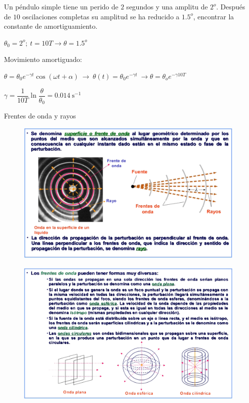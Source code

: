 \begin{prob}
Un péndulo	simple tiene un perido de $2$ segundos y una amplitu de $2^o$. Después de $10$ oscilaciones completas su amplitud se ha reducido a $1.5^o$, encontrar la constante de amortiguamiento.
\end{prob}

$\theta_0=2^o;\ t=10 T \to \theta =1.5^o$

Movimiento amortiguado: 

$ \theta=\theta_0 e^{-\gamma t}\cos (\omega t + \alpha) \ \to \ \theta(t)=\theta_0 e^{-\gamma t} \ \to \theta=\theta_o e^{-\gamma 10 T}$

$\gamma=\dfrac {1}{10T} \ln \dfrac {\theta}{\theta_0}=0.014 \ \mathrm{s}^{-1}$







\newpage
\begin{myblock}{Frentes de onda y rayos}
	\begin{figure}[H]
		\centering
		\includegraphics[width=1\textwidth]{imagenes/imagenes21/T21IM11.png}
	\end{figure}
	\begin{figure}[H]
		\centering
		\includegraphics[width=1\textwidth]{imagenes/imagenes21/T21IM12.png}
	\end{figure}
\end{myblock}



